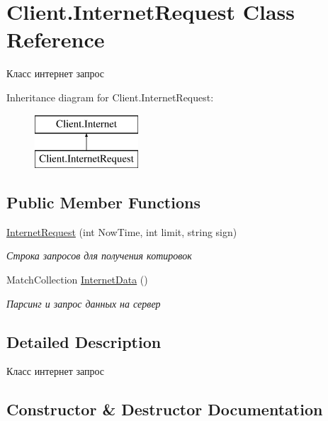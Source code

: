 \hypertarget{class_client_1_1_internet_request}{}\section{Client.\+Internet\+Request Class Reference}
\label{class_client_1_1_internet_request}


Класс интернет запрос  


Inheritance diagram for Client.\+Internet\+Request\+:\begin{figure}[H]
\begin{center}
\leavevmode
\includegraphics[height=2.000000cm]{class_client_1_1_internet_request}
\end{center}
\end{figure}
\subsection*{Public Member Functions}
\begin{DoxyCompactItemize}
\item 
\hyperlink{class_client_1_1_internet_request_a954431ce4c7f20d28a05158ab3238714}{Internet\+Request} (int Now\+Time, int limit, string sign)
\begin{DoxyCompactList}\small\item\em Строка запросов для получения котировок \end{DoxyCompactList}\item 
Match\+Collection \hyperlink{class_client_1_1_internet_request_aba2389a5a186697ed6eb3ed23edac309}{Internet\+Data} ()
\begin{DoxyCompactList}\small\item\em Парсинг и запрос данных на сервер \end{DoxyCompactList}\end{DoxyCompactItemize}


\subsection{Detailed Description}
Класс интернет запрос 



\subsection{Constructor \& Destructor Documentation}
\hypertarget{class_client_1_1_internet_request_a954431ce4c7f20d28a05158ab3238714}{}\label{class_client_1_1_internet_request_a954431ce4c7f20d28a05158ab3238714} 

